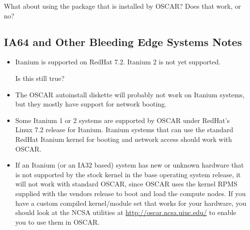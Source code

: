 \begin{itemize}
  \begin{discuss}
    What about using the  package that is
    installed by OSCAR?  Does that work, or no?
  \end{discuss}

\end{itemize}


\subsection{IA64 and Other Bleeding Edge Systems Notes}
\label{subsec:ia64notes}

\begin{itemize}
  
\item Itanium is supported on RedHat 7.2.  Itanium 2 is not yet
  supported.

  \begin{discuss}
    Is this still true?
  \end{discuss}
  
\item The OSCAR autoinstall diskette will probably not work on Itanium
  systems, but they mostly have support for network booting.
  
\item Some Itanium 1 or 2 systems are supported by OSCAR under
  RedHat's Linux 7.2 release for Itanium.  Itanium systems that can
  use the standard RedHat Itanium kernel for booting and network
  access should work with OSCAR.
  
\item If an Itanium (or an IA32 based) system has new or unknown
  hardware that is not supported by the stock kernel in the base
  operating system release, it will not work with standard OSCAR,
  since OSCAR uses the kernel RPMS supplied with the vendors release
  to boot and load the compute nodes.  If you have a custom compiled
  kernel/module set that works for your hardware, you should look at
  the NCSA utilities at \url{http://oscar.ncsa.uiuc.edu/} to
  enable you to use them in OSCAR.
\end{itemize}





